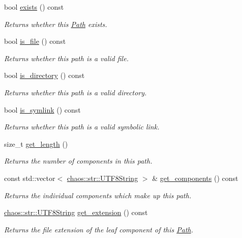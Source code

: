 \begin{DoxyCompactItemize}
bool \hyperlink{classchaos_1_1io_1_1file_1_1_path_a84341dd8d78dd14d678b9efefdb033f6}{exists} () const 
\begin{DoxyCompactList}\small\item\em Returns whether this \hyperlink{classchaos_1_1io_1_1file_1_1_path}{Path} exists. \end{DoxyCompactList}\item 
bool \hyperlink{classchaos_1_1io_1_1file_1_1_path_a79783cb35e9c75b07e43b36d7b46cfc3}{is\+\_\+file} () const 
\begin{DoxyCompactList}\small\item\em Returns whether this path is a valid file. \end{DoxyCompactList}\item 
bool \hyperlink{classchaos_1_1io_1_1file_1_1_path_adb659adabee8f98e0fc275b85dc6e769}{is\+\_\+directory} () const 
\begin{DoxyCompactList}\small\item\em Returns whether this path is a valid directory. \end{DoxyCompactList}\item 
bool \hyperlink{classchaos_1_1io_1_1file_1_1_path_a17813b254b42a9f386930ba849b1aef6}{is\+\_\+symlink} () const 
\begin{DoxyCompactList}\small\item\em Returns whether this path is a valid symbolic link. \end{DoxyCompactList}\item 
size\+\_\+t \hyperlink{classchaos_1_1io_1_1file_1_1_path_a00826d85bf8a3dca722ddf67d021d1b2}{get\+\_\+length} ()
\begin{DoxyCompactList}\small\item\em Returns the number of components in this path. \end{DoxyCompactList}\item 
const std\+::vector$<$ \hyperlink{classchaos_1_1str_1_1_u_t_f8_string}{chaos\+::str\+::\+U\+T\+F8\+String} $>$ \& \hyperlink{classchaos_1_1io_1_1file_1_1_path_a2cf2f806bd7e8969c6cd215271c0e104}{get\+\_\+components} () const 
\begin{DoxyCompactList}\small\item\em Returns the individual components which make up this path. \end{DoxyCompactList}\item 
\hyperlink{classchaos_1_1str_1_1_u_t_f8_string}{chaos\+::str\+::\+U\+T\+F8\+String} \hyperlink{classchaos_1_1io_1_1file_1_1_path_a5af8f558c2b97ca7c64624fe2c494a80}{get\+\_\+extension} () const 
\begin{DoxyCompactList}\small\item\em Returns the file extension of the leaf component of this \hyperlink{classchaos_1_1io_1_1file_1_1_path}{Path}. \end{DoxyCompactList}\end{DoxyCompactItemize}


